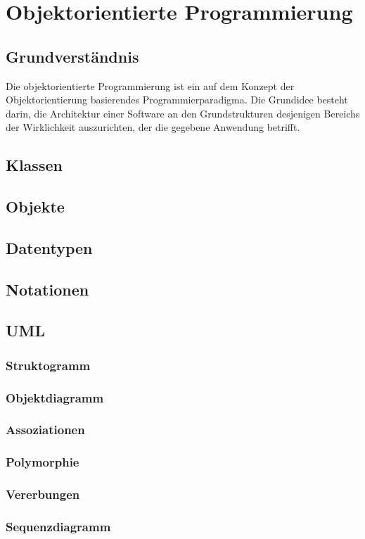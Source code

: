 \documentclass[12pt,a4paper]{article}
\begin{document}
\section{Objektorientierte Programmierung}
\subsection{Grundverständnis}
Die objektorientierte Programmierung ist ein auf dem Konzept der Objektorientierung basierendes
Programmierparadigma. Die Grundidee besteht darin, die Architektur einer Software an den Grundstrukturen desjenigen
Bereichs der Wirklichkeit auszurichten, der die gegebene Anwendung betrifft.
\subsection{Klassen}
\subsection{Objekte}
\subsection{Datentypen}
\subsection{Notationen}
\subsection{UML}
\subsubsection{Struktogramm}
\subsubsection{Objektdiagramm}
\subsubsection{Assoziationen}
\subsubsection{Polymorphie}
\subsubsection{Vererbungen}
\subsubsection{Sequenzdiagramm}
\end{document}
